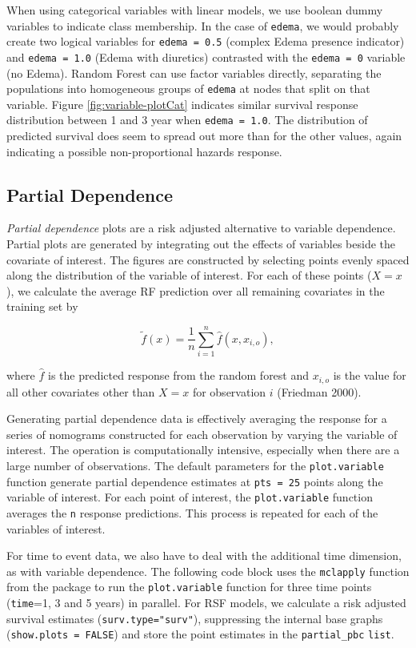 \documentclass[article]{jss}
\begin{document}
When using categorical variables with linear models, we use boolean
dummy variables to indicate class membership. In the case of
\texttt{edema}, we would probably create two logical variables for
\texttt{edema\ =\ 0.5} (complex Edema presence indicator) and
\texttt{edema\ =\ 1.0} (Edema with diuretics) contrasted with the
\texttt{edema\ =\ 0} variable (no Edema). Random Forest can use factor
variables directly, separating the populations into homogeneous groups
of \texttt{edema} at nodes that split on that variable. Figure
\ref{fig:variable-plotCat} indicates similar survival response
distribution between 1 and 3 year when \texttt{edema\ =\ 1.0}. The
distribution of predicted survival does seem to spread out more than for
the other values, again indicating a possible non-proportional hazards
response.

\subsection{Partial Dependence}\label{partial-dependence}

\emph{Partial dependence} plots are a risk adjusted alternative to
variable dependence. Partial plots are generated by integrating out the
effects of variables beside the covariate of interest. The figures are
constructed by selecting points evenly spaced along the distribution of
the variable of interest. For each of these points (\(X = x\)), we
calculate the average RF prediction over all remaining covariates in the
training set by

\[
\tilde{f}(x) = \frac{1}{n} \sum_{i = 1}^n \hat{f}(x, x_{i, o}),
\label{E:partial}
\]

where \(\hat{f}\) is the predicted response from the random forest and
\(x_{i, o}\) is the value for all other covariates other than \(X = x\)
for observation \(i\) (Friedman 2000).

Generating partial dependence data is effectively averaging the response
for a series of nomograms constructed for each observation by varying
the variable of interest. The operation is computationally intensive,
especially when there are a large number of observations. The default
parameters for the \texttt{plot.variable} function generate partial
dependence estimates at \texttt{pts\ =\ 25} points along the variable of
interest. For each point of interest, the \texttt{plot.variable}
function averages the \texttt{n} response predictions. This process is
repeated for each of the variables of interest.

For time to event data, we also have to deal with the additional time
dimension, as with variable dependence. The following code block uses
the \texttt{mclapply} function from the  package to run
the \texttt{plot.variable} function for three time points
(\texttt{time}=1, 3 and 5 years) in parallel. For RSF models, we
calculate a risk adjusted survival estimates
(\texttt{surv.type="surv"}), suppressing the internal base graphs
(\texttt{show.plots\ =\ FALSE}) and store the point estimates in the
\texttt{partial\_pbc} \texttt{list}.
\end{document}
